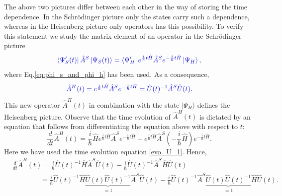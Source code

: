 \documentclass[
11pt, %
english, %
singlespacing, %
headsepline, %
]{MastersDoctoralThesis} %
\begin{document}
The above two pictures differ between each other in the way of storing the time dependence. In the Schrödinger picture only the states carry such a dependence, whereas in the Heisenberg picture only operators has this possibility. To verify this statement we study the matrix element of an operator in the Schrödinger picture
\begin{equation}\label{eq:matrix_ele_time_dep}
\textcolor[RGB]{0,0,204}{
\bra{\Psi^{\prime}_{S}(t)}\hat{A}^{S}\ket{\Psi_{S} (t)}
=\bra{\Psi^{\prime}_{H}}e^{\frac{i}{\hbar}t\hat{H}}\hat{A}^{S}
e^{-\frac{i}{\hbar}t\hat{H}}\ket{\Psi_{H} },
}
\end{equation}
where Eq.\enskip\eqref{eq:phi_s_and_phi_h} has been used. As a consequence, 
\begin{equation}\label{eq:S-H-Operator_Trafo}
\textcolor[RGB]{0,0,204}{
\hat{A}^{H}(t)=e^{\frac{i}{\hbar}t\hat{H}}\hat{A}^{S}
e^{-\frac{i}{\hbar}t\hat{H}}=\hat{U}(t)^{-1}\hat{A}^{S}\hat{U}(t).
}
\end{equation}
This new operator $ \hat{A}^{H}(t) $ in combination with the state $ \vert\Psi_{H} \rangle$ defines the Heisenberg picture. Observe that the time evolution of $ \hat{A}^{H}(t) $  is dictated by an equation that follows from differentiating the equation above with respect to $ t $:
\begin{equation}
\frac{d}{dt}\hat{A}^{H}(t)
=\frac{i}{\hbar}\hat{H}
e^{\frac{i}{\hbar}t \hat{H}}
\hat{A}^{S}
e^{-\frac{i}{\hbar}t \hat{H}}
+e^{\frac{i}{\hbar}t \hat{H}}
\hat{A}^{S}
\left( -\frac{i}{\hbar}\hat{H}\right) 
e^{-\frac{i}{\hbar}t \hat{H}}.
\end{equation}
Here we have used the  time evolution equation \eqref{evo_U_1}. Hence,
\begin{equation}\label{time_evo_seven}
\begin{split}
&\frac{d}{dt}\hat{A}^{H}(t)
	=\frac{i}{\hbar}
	\hat{U}(t)^{-1}\hat{H}\hat{A}^{S}\hat{U}(t)
	-
	\frac{i}{\hbar}
	\hat{U}(t)^{-1}\hat{A}^{S}\hat{H}\hat{U}(t)
	\\
&\qquad\qquad=\frac{i}{\hbar}
	\hat{U}(t)^{-1}\hat{H}\underbrace{\hat{U}(t)\hat{U}(t)^{-1}}_{=1}\hat{A}^{S}\hat{U}(t)
	-
	\frac{i}{\hbar}
	\hat{U}(t)^{-1}\hat{A}^{S}\underbrace{\hat{U}(t)\hat{U}(t)^{-1}}_{=1}\hat{H}\hat{U}(t).
\end{split}
\end{equation}
\end{document}
